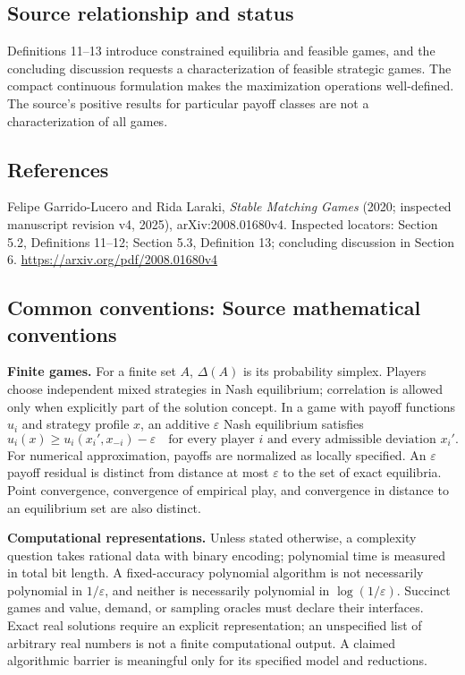 \documentclass[11pt,a4paper]{article}
\begin{document}
\subsection*{Source relationship and status}
Definitions 11--13 introduce constrained equilibria and feasible games, and the concluding discussion requests a characterization of feasible strategic games. The compact continuous formulation makes the maximization operations well-defined. The source's positive results for particular payoff classes are not a characterization of all games.

\subsection*{References}
\begingroup\footnotesize\raggedright
\noindent [S1] Felipe Garrido-Lucero and Rida Laraki, \emph{Stable Matching Games} (2020; inspected manuscript revision v4, 2025), arXiv:2008.01680v4. Inspected locators: Section 5.2, Definitions 11--12; Section 5.3, Definition 13; concluding discussion in Section 6.
\url{https://arxiv.org/pdf/2008.01680v4}
\par\endgroup

\subsection*{Common conventions: Source mathematical conventions}

\textbf{Finite games.} For a finite set $A$, $\Delta(A)$ is its probability
simplex. Players choose independent mixed strategies in Nash equilibrium;
correlation is allowed only when explicitly part of the solution concept.
In a game with payoff functions $u_i$ and strategy profile $x$, an additive
$\varepsilon$ Nash equilibrium satisfies
\[
 u_i(x)\geq u_i(x_i',x_{-i})-\varepsilon
 \quad\text{for every player $i$ and every admissible deviation $x_i'$}.
\]
For numerical approximation, payoffs are normalized as locally specified.
An $\varepsilon$ payoff residual is distinct from distance at most
$\varepsilon$ to the set of exact equilibria. Point convergence, convergence
of empirical play, and convergence in distance to an equilibrium set are
also distinct.

\textbf{Computational representations.} Unless stated otherwise, a complexity
question takes rational data with binary encoding; polynomial time is measured
in total bit length. A fixed-accuracy polynomial algorithm is not necessarily
polynomial in $1/\varepsilon$, and neither is necessarily polynomial in
$\log(1/\varepsilon)$. Succinct games and value, demand, or sampling oracles
must declare their interfaces. Exact real solutions require an explicit
representation; an unspecified list of arbitrary real numbers is not a
finite computational output. A claimed algorithmic barrier is meaningful
only for its specified model and reductions.
\end{document}
